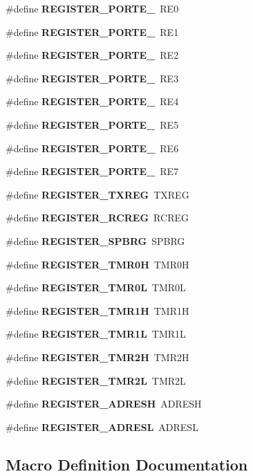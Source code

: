 \begin{DoxyCompactItemize}
\item 
\#define {\bf R\-E\-G\-I\-S\-T\-E\-R\-\_\-\-P\-O\-R\-T\-E\-\_}~R\-E0
\item 
\#define {\bf R\-E\-G\-I\-S\-T\-E\-R\-\_\-\-P\-O\-R\-T\-E\-\_}~R\-E1
\item 
\#define {\bf R\-E\-G\-I\-S\-T\-E\-R\-\_\-\-P\-O\-R\-T\-E\-\_}~R\-E2
\item 
\#define {\bf R\-E\-G\-I\-S\-T\-E\-R\-\_\-\-P\-O\-R\-T\-E\-\_}~R\-E3
\item 
\#define {\bf R\-E\-G\-I\-S\-T\-E\-R\-\_\-\-P\-O\-R\-T\-E\-\_}~R\-E4
\item 
\#define {\bf R\-E\-G\-I\-S\-T\-E\-R\-\_\-\-P\-O\-R\-T\-E\-\_}~R\-E5
\item 
\#define {\bf R\-E\-G\-I\-S\-T\-E\-R\-\_\-\-P\-O\-R\-T\-E\-\_}~R\-E6
\item 
\#define {\bf R\-E\-G\-I\-S\-T\-E\-R\-\_\-\-P\-O\-R\-T\-E\-\_}~R\-E7
\item 
\#define {\bf R\-E\-G\-I\-S\-T\-E\-R\-\_\-\-T\-X\-R\-E\-G}~T\-X\-R\-E\-G
\item 
\#define {\bf R\-E\-G\-I\-S\-T\-E\-R\-\_\-\-R\-C\-R\-E\-G}~R\-C\-R\-E\-G
\item 
\#define {\bf R\-E\-G\-I\-S\-T\-E\-R\-\_\-\-S\-P\-B\-R\-G}~S\-P\-B\-R\-G
\item 
\#define {\bf R\-E\-G\-I\-S\-T\-E\-R\-\_\-\-T\-M\-R0\-H}~T\-M\-R0\-H
\item 
\#define {\bf R\-E\-G\-I\-S\-T\-E\-R\-\_\-\-T\-M\-R0\-L}~T\-M\-R0\-L
\item 
\#define {\bf R\-E\-G\-I\-S\-T\-E\-R\-\_\-\-T\-M\-R1\-H}~T\-M\-R1\-H
\item 
\#define {\bf R\-E\-G\-I\-S\-T\-E\-R\-\_\-\-T\-M\-R1\-L}~T\-M\-R1\-L
\item 
\#define {\bf R\-E\-G\-I\-S\-T\-E\-R\-\_\-\-T\-M\-R2\-H}~T\-M\-R2\-H
\item 
\#define {\bf R\-E\-G\-I\-S\-T\-E\-R\-\_\-\-T\-M\-R2\-L}~T\-M\-R2\-L
\item 
\#define {\bf R\-E\-G\-I\-S\-T\-E\-R\-\_\-\-A\-D\-R\-E\-S\-H}~A\-D\-R\-E\-S\-H
\item 
\#define {\bf R\-E\-G\-I\-S\-T\-E\-R\-\_\-\-A\-D\-R\-E\-S\-L}~A\-D\-R\-E\-S\-L
\end{DoxyCompactItemize}


\subsection{Macro Definition Documentation}
